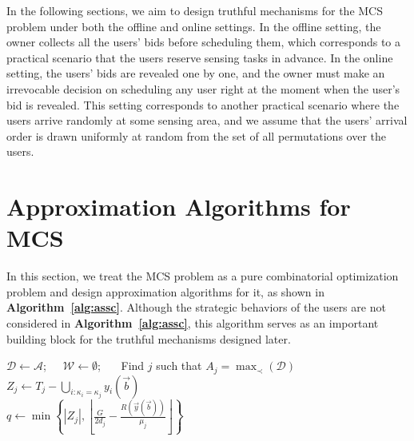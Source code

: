 \documentclass[10pt,journal,compsoc]{IEEEtran}
\begin{document}
    In the following sections, we aim to design truthful mechanisms for the MCS problem under both the offline and online settings. In the offline setting, the owner collects all the users' bids before scheduling them, which corresponds to a practical scenario that the users reserve sensing tasks in advance. In the online setting, the users' bids are revealed one by one, and the owner must make an irrevocable decision on scheduling any user right at the moment when the user's bid is revealed. This setting corresponds to another practical scenario where the users arrive randomly at some sensing area, and we assume that the users' arrival order is drawn uniformly at random from the set of all permutations over the users.



\section{Approximation Algorithms for MCS} \label{sec:appro}
In this section, we treat the MCS problem as a pure combinatorial optimization problem and design approximation algorithms for it, as shown in \textbf{Algorithm~\ref{alg:assc}}. Although the strategic behaviors of the users are not considered in \textbf{Algorithm~\ref{alg:assc}}, this algorithm serves as an important building block for the truthful mechanisms designed later.
\begin{algorithm}[htb]
$\mathcal{D}\leftarrow \mathcal{A}$;~~~$\mathcal{W} \leftarrow \emptyset$;~~~
     {\label{ln:lpbegin}
        Find $j$ such that $A_j=\max_{\prec}(\mathcal{D})$ \label{ln:greedysel}~\\
$Z_j\leftarrow T_j-\bigcup_{i:\kappa_i=\kappa_j}y_i(\vec{b})$\\ \label{ln:optionalperiod}
        $q\leftarrow \min\left\{|Z_j|, \left\lfloor\frac{G}{2d_j}-\frac{R(\vec{y}(\vec{b}))}{\mu_j}\right\rfloor\right\}$ \label{ln:allocatetime}~\\
    }\label{ln:lpend}
    \caption{$\mathsf{ApproxMCS}(n, G, \vec{b}, \mathcal{A})$}
    \label{alg:assc}
  \end{algorithm}
\end{document}
